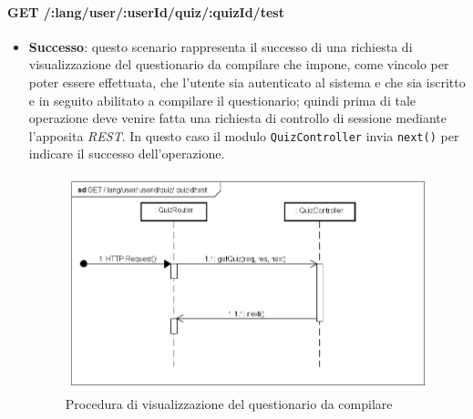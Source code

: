 \paragraph{GET /:lang/user/:userId/quiz/:quizId/test} %
\begin{itemize}
\item \textbf{Successo}: questo scenario rappresenta il successo di una richiesta di visualizzazione del questionario da compilare che impone, come vincolo per poter essere effettuata, che l'utente sia autenticato al sistema e che sia iscritto e in seguito abilitato a compilare il questionario; quindi prima di tale operazione deve venire fatta una richiesta di controllo di sessione mediante l'apposita \textit{REST}. In questo caso il modulo \texttt{QuizController} invia \texttt{next()} per indicare il successo dell'operazione.
\label{Procedura di visualizzazione del questionario da compilare}
\begin{figure}[ht]
	\centering
	\includegraphics[scale=0.40]{UML/DiagrammiDiSequenza/Back-end/GET__lang_user_userId_quiz_quizId_test_success.png}
	\caption{Procedura di visualizzazione del questionario da compilare}
\end{figure}
\FloatBarrier


\end{itemize}
